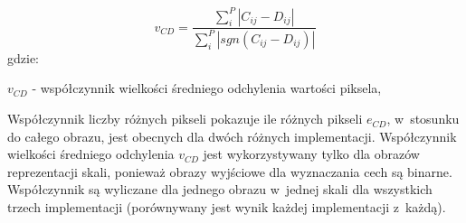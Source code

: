 \begin{equation}
\label{eq:sredniaOdchylenia}
v_{CD} = \frac{\sum_{i}^{P}|C_{ij}-D_{ij}|}{\sum_{i}^{P}|sgn(C_{ij}-D_{ij})|}
\end{equation}
gdzie:

$ v_{CD} $ - współczynnik wielkości średniego odchylenia wartości piksela,

Współczynnik liczby różnych pikseli pokazuje ile różnych pikseli $ e_{CD} $, w~stosunku do całego obrazu, jest obecnych dla dwóch różnych implementacji. Współczynnik wielkości średniego odchylenia $ v_{CD} $ jest wykorzystywany tylko dla obrazów reprezentacji skali, ponieważ obrazy wyjściowe dla wyznaczania cech są binarne. Współczynnik są wyliczane dla jednego obrazu w~jednej skali dla wszystkich trzech implementacji (porównywany jest wynik każdej implementacji z~każdą).
